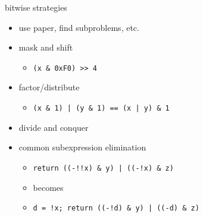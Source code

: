 \begin{frame}[fragile,label=bitStrat]{bitwise strategies}
    \begin{itemize}
        \item use paper, find subproblems, etc.
        \item mask and shift 
            \begin{itemize}
                \item \lstinline+(x & 0xF0) >> 4+
            \end{itemize}
        \item factor/distribute
            \begin{itemize}
                \item \lstinline+(x & 1) | (y & 1) == (x | y) & 1+
            \end{itemize}
        \item divide and conquer
        \item common subexpression elimination
            \begin{itemize}
                \item \lstinline+return ((-!!x) & y) | ((-!x) & z)+
                \item becomes
                \item \lstinline+d = !x; return ((-!d) & y) | ((-d) & z)+
            \end{itemize}
    \end{itemize}
\end{frame}


